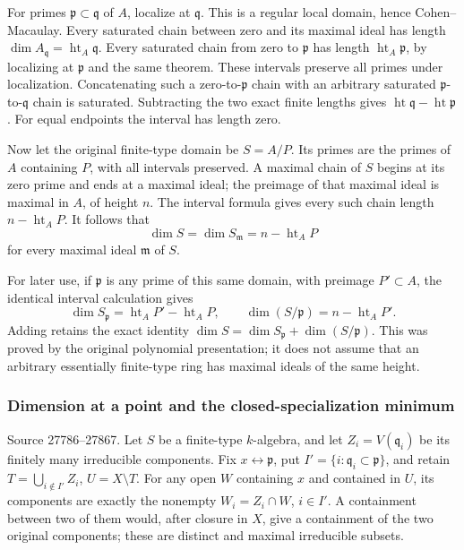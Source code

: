 For primes \(\mathfrak p\subset\mathfrak q\) of \(A\), localize at \(\mathfrak q\). This is a regular local domain, hence Cohen--Macaulay. Every saturated chain between zero and its maximal ideal has length \(\dim A_{\mathfrak q}=\operatorname{ht}_A\mathfrak q\). Every saturated chain from zero to \(\mathfrak p\) has length \(\operatorname{ht}_A\mathfrak p\), by localizing at \(\mathfrak p\) and the same theorem. These intervals preserve all primes under localization. Concatenating such a zero-to-\(\mathfrak p\) chain with an arbitrary saturated \(\mathfrak p\)-to-\(\mathfrak q\) chain is saturated. Subtracting the two exact finite lengths gives \(\operatorname{ht}\mathfrak q-\operatorname{ht}\mathfrak p\). For equal endpoints the interval has length zero.

Now let the original finite-type domain be \(S=A/P\). Its primes are the primes of \(A\) containing \(P\), with all intervals preserved. A maximal chain of \(S\) begins at its zero prime and ends at a maximal ideal; the preimage of that maximal ideal is maximal in \(A\), of height \(n\). The interval formula gives every such chain length \(n-\operatorname{ht}_A P\). It follows that \[
 \dim S=\dim S_{\mathfrak m}=n-\operatorname{ht}_A P
\] for every maximal ideal \(\mathfrak m\) of \(S\).

For later use, if \(\mathfrak p\) is any prime of this same domain, with preimage \(P'\subset A\), the identical interval calculation gives \[
 \dim S_{\mathfrak p}=\operatorname{ht}_A P'-\operatorname{ht}_A P,
 \qquad
 \dim(S/\mathfrak p)=n-\operatorname{ht}_A P'.
\] Adding retains the exact identity \(\dim S=\dim S_{\mathfrak p}+\dim(S/\mathfrak p)\). This was proved by the original polynomial presentation; it does not assume that an arbitrary essentially finite-type ring has maximal ideals of the same height.

\subsubsection{Dimension at a point and the closed-specialization minimum}\label{algebra-proof-025-dimension-at-a-point-and-the-closed-specialization-minimum}

Source 27786--27867. Let \(S\) be a finite-type \(k\)-algebra, and let \(Z_i=V(\mathfrak q_i)\) be its finitely many irreducible components. Fix \(x\leftrightarrow\mathfrak p\), put \(I'=\{i:\mathfrak q_i\subset
\mathfrak p\}\), and retain \(T=\bigcup_{i\notin I'}Z_i\), \(U=X\setminus T\). For any open \(W\) containing \(x\) and contained in \(U\), its components are exactly the nonempty \(W_i=Z_i\cap W\), \(i\in I'\). A containment between two of them would, after closure in \(X\), give a containment of the two original components; these are distinct and maximal irreducible subsets.

